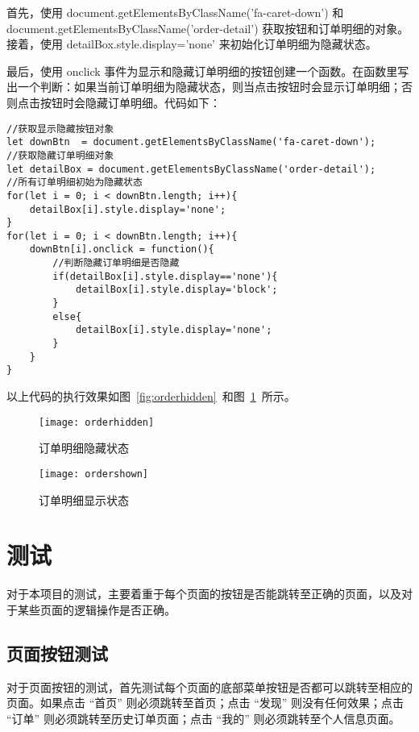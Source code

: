 首先，使用 document.getElementsByClassName('fa-caret-down') 和 document.getElementsByClassName('order-detail') 获取按钮和订单明细的对象。接着，使用 detailBox.style.display='none' 来初始化订单明细为隐藏状态。

最后，使用 onclick 事件为显示和隐藏订单明细的按钮创建一个函数。在函数里写出一个判断：如果当前订单明细为隐藏状态，则当点击按钮时会显示订单明细；否则点击按钮时会隐藏订单明细。代码如下：
\begin{lstlisting}[basicstyle=\footnotesize]
//获取显示隐藏按钮对象
let downBtn  = document.getElementsByClassName('fa-caret-down');
//获取隐藏订单明细对象
let detailBox = document.getElementsByClassName('order-detail');
//所有订单明细初始为隐藏状态
for(let i = 0; i < downBtn.length; i++){
    detailBox[i].style.display='none';
}
for(let i = 0; i < downBtn.length; i++){
    downBtn[i].onclick = function(){
        //判断隐藏订单明细是否隐藏
        if(detailBox[i].style.display=='none'){
            detailBox[i].style.display='block';
        }
        else{
            detailBox[i].style.display='none';
        }
    }
}
\end{lstlisting}
以上代码的执行效果如图~\ref{fig:orderhidden}~和图~\ref{fig:ordershown}~所示。
\begin{figure}[htbp]
    \centering
    \begin{minipage}{0.4\textwidth}
    \centering
    \texttt{[image: orderhidden]}
    \caption{订单明细隐藏状态}\label{fig:orderhidden}
    \end{minipage}
    \begin{minipage}{0.4\textwidth}
    \centering
    \texttt{[image: ordershown]}
    \caption{订单明细显示状态}\label{fig:ordershown}
    \end{minipage}
    \vspace{\baselineskip}
\end{figure}

\section{测试}
对于本项目的测试，主要着重于每个页面的按钮是否能跳转至正确的页面，以及对于某些页面的逻辑操作是否正确。

\subsection{页面按钮测试}
对于页面按钮的测试，首先测试每个页面的底部菜单按钮是否都可以跳转至相应的页面。如果点击 “首页” 则必须跳转至首页；点击 “发现” 则没有任何效果；点击 “订单” 则必须跳转至历史订单页面；点击 “我的” 则必须跳转至个人信息页面。

